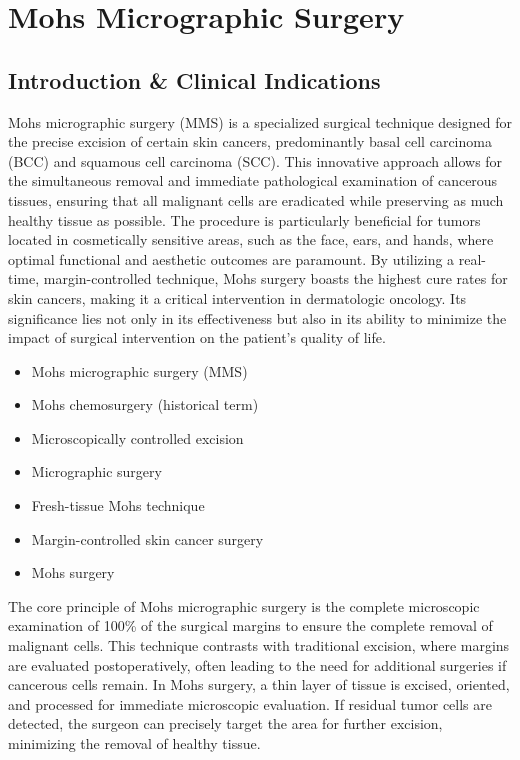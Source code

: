 \chapter{Mohs Micrographic Surgery}

\section*{Introduction \& Clinical Indications}
Mohs micrographic surgery (MMS) is a specialized surgical technique designed for the precise excision of certain skin cancers, predominantly basal cell carcinoma (BCC) and squamous cell carcinoma (SCC). This innovative approach allows for the simultaneous removal and immediate pathological examination of cancerous tissues, ensuring that all malignant cells are eradicated while preserving as much healthy tissue as possible. The procedure is particularly beneficial for tumors located in cosmetically sensitive areas, such as the face, ears, and hands, where optimal functional and aesthetic outcomes are paramount. By utilizing a real-time, margin-controlled technique, Mohs surgery boasts the highest cure rates for skin cancers, making it a critical intervention in dermatologic oncology. Its significance lies not only in its effectiveness but also in its ability to minimize the impact of surgical intervention on the patient's quality of life.

\begin{itemize}
  \item Mohs micrographic surgery (MMS)
  \item Mohs chemosurgery (historical term)
  \item Microscopically controlled excision
  \item Micrographic surgery
  \item Fresh-tissue Mohs technique
  \item Margin-controlled skin cancer surgery
  \item Mohs surgery
\end{itemize}

The core principle of Mohs micrographic surgery is the complete microscopic examination of 100\% of the surgical margins to ensure the complete removal of malignant cells. This technique contrasts with traditional excision, where margins are evaluated postoperatively, often leading to the need for additional surgeries if cancerous cells remain. In Mohs surgery, a thin layer of tissue is excised, oriented, and processed for immediate microscopic evaluation. If residual tumor cells are detected, the surgeon can precisely target the area for further excision, minimizing the removal of healthy tissue.

